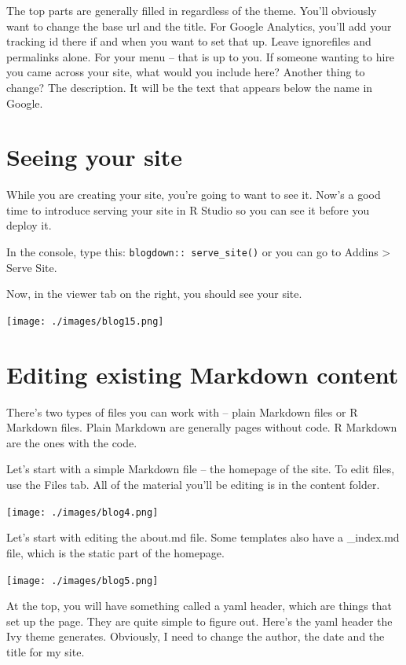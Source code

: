 \documentclass[
  letterpaper,
  DIV=11,
  numbers=noendperiod]{scrreprt}
\begin{document}
The top parts are generally filled in regardless of the theme. You'll
obviously want to change the base url and the title. For Google
Analytics, you'll add your tracking id there if and when you want to set
that up. Leave ignorefiles and permalinks alone. For your menu -- that
is up to you. If someone wanting to hire you came across your site, what
would you include here? Another thing to change? The description. It
will be the text that appears below the name in Google.

\hypertarget{seeing-your-site}{%
\section{Seeing your site}\label{seeing-your-site}}

While you are creating your site, you're going to want to see it. Now's
a good time to introduce serving your site in R Studio so you can see it
before you deploy it.

In the console, type this: \texttt{blogdown::\ serve\_site()} or you can
go to Addins \textgreater{} Serve Site.

Now, in the viewer tab on the right, you should see your site.

\texttt{[image: ./images/blog15.png]}

\hypertarget{editing-existing-markdown-content}{%
\section{Editing existing Markdown
content}\label{editing-existing-markdown-content}}

There's two types of files you can work with -- plain Markdown files or
R Markdown files. Plain Markdown are generally pages without code. R
Markdown are the ones with the code.

Let's start with a simple Markdown file -- the homepage of the site. To
edit files, use the Files tab. All of the material you'll be editing is
in the content folder.

\texttt{[image: ./images/blog4.png]}

Let's start with editing the about.md file. Some templates also have a
\_index.md file, which is the static part of the homepage.

\texttt{[image: ./images/blog5.png]}

At the top, you will have something called a yaml header, which are
things that set up the page. They are quite simple to figure out. Here's
the yaml header the Ivy theme generates. Obviously, I need to change the
author, the date and the title for my site.
\end{document}
